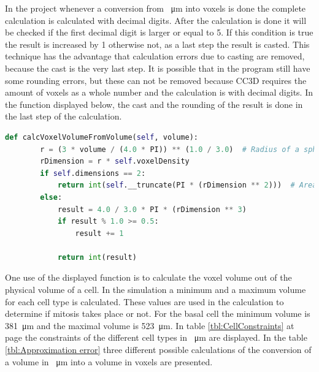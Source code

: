 In the project whenever a conversion from \SI{}{\micro\metre} into voxels is done the complete calculation is calculated with decimal digits. After the calculation is done it will be checked if the first decimal digit is larger or equal to 5. If this condition is true the result is increased by 1 otherwise not, as a last step the result is casted. This technique has the advantage that calculation errors due to casting are removed, because the cast is the very last step. It is possible that in the program still have some rounding errors, but these can not be removed because \ac{CC3D} requires the amount of voxels as a whole number and the calculation is with decimal digits. \newline
In the function displayed below, the cast and the rounding of the result is done in the last step of the calculation.

\begin{lstlisting}[language=Python, caption = Function to calculate the volume of a sphere in voxels out of a given physical volume. First out of the given physical volume the radius is calculated. Then the radius is converted into the voxel unit. Next\, the volume of the voxel sphere is calculated and as last step\, the result is rounded and casted.]
   def calcVoxelVolumeFromVolume(self, volume):
        r = (3 * volume / (4.0 * PI)) ** (1.0 / 3.0)  # Radius of a sphere with known volume.
        rDimension = r * self.voxelDensity
        if self.dimensions == 2:
            return int(self.__truncate(PI * (rDimension ** 2)))  # Area of a circle.
        else:
            result = 4.0 / 3.0 * PI * (rDimension ** 3)
            if result % 1.0 >= 0.5:
                result += 1

            return int(result)
\end{lstlisting}

One use of the displayed function is to calculate the voxel volume out of the physical volume of a cell. In the simulation a minimum and a maximum volume for each cell type is calculated. These values are used in the calculation to determine if mitosis takes place or not. \newline
For the basal cell the minimum volume is \SI{381}{\micro\metre} and the maximal volume is \SI{523}{\micro\metre}. In table \ref{tbl:CellConstraints} at page \pageref{tbl:CellConstraints} the constraints of the different cell types in \SI{}{\micro\metre} are displayed. In the table \ref{tbl:Approximation error} three different possible calculations of the conversion of a volume in \SI{}{\micro\metre} into a volume in voxels are presented.

